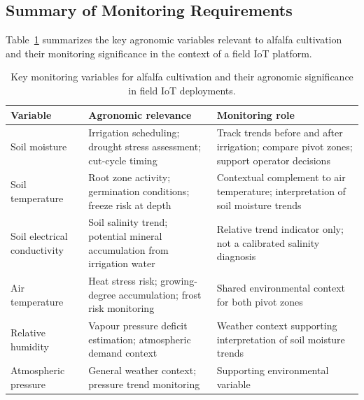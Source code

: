 \subsection{Summary of Monitoring Requirements}
\label{subsec:alfalfa-monitoring-summary}

Table~\ref{tab:alfalfa-monitoring-needs} summarizes the key agronomic variables
relevant to alfalfa cultivation and their monitoring significance in the context
of a field IoT platform.

\begin{table}[H]
  \centering
  \caption{Key monitoring variables for alfalfa cultivation and their agronomic
           significance in field IoT deployments.}
  \label{tab:alfalfa-monitoring-needs}
  \renewcommand{\arraystretch}{1.3}
  \begin{tabular}{|p{3.2cm}|p{5.0cm}|p{5.8cm}|}
    \hline
    \textbf{Variable} & \textbf{Agronomic relevance} & \textbf{Monitoring role} \\
    \hline
    Soil moisture & Irrigation scheduling; drought stress assessment;
                    cut-cycle timing & Track trends before and after irrigation;
                    compare pivot zones; support operator decisions \\
    \hline
    Soil temperature & Root zone activity; germination conditions;
                       freeze risk at depth & Contextual complement to air
                       temperature; interpretation of soil moisture trends \\
    \hline
    Soil electrical conductivity & Soil salinity trend; potential mineral
                                   accumulation from irrigation water &
                                   Relative trend indicator only; not a
                                   calibrated salinity diagnosis \\
    \hline
    Air temperature & Heat stress risk; growing-degree accumulation;
                      frost risk monitoring & Shared environmental context
                      for both pivot zones \\
    \hline
    Relative humidity & Vapour pressure deficit estimation; atmospheric
                        demand context & Weather context supporting
                        interpretation of soil moisture trends \\
    \hline
    Atmospheric pressure & General weather context; pressure trend
                           monitoring & Supporting environmental variable \\
    \hline
  \end{tabular}
\end{table}

